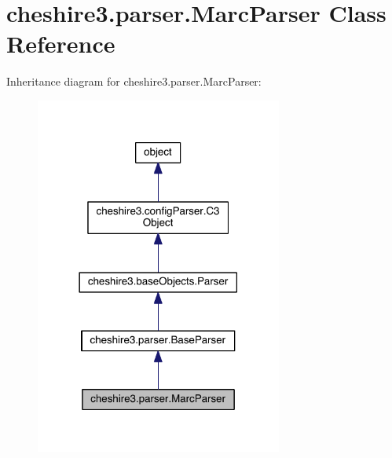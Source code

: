 \hypertarget{classcheshire3_1_1parser_1_1_marc_parser}{\section{cheshire3.\-parser.\-Marc\-Parser Class Reference}
\label{classcheshire3_1_1parser_1_1_marc_parser}
}


Inheritance diagram for cheshire3.\-parser.\-Marc\-Parser\-:
\nopagebreak
\begin{figure}[H]
\begin{center}
\leavevmode
\includegraphics[width=230pt]{classcheshire3_1_1parser_1_1_marc_parser__inherit__graph}
\end{center}
\end{figure}


